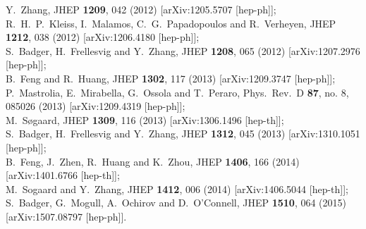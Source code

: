 \documentclass[aps,prd,preprint,groupedaddress,nofootinbib,showpacs,eqsecnum]{revtex4}
\begin{document}
\begin{thebibliography}{99}
Y.~Zhang,
JHEP {\bf 1209}, 042 (2012)
[arXiv:1205.5707 [hep-ph]];\\
R.~H.~P.~Kleiss, I.~Malamos, C.~G.~Papadopoulos and R.~Verheyen,
JHEP {\bf 1212}, 038 (2012)
[arXiv:1206.4180 [hep-ph]];\\
S.~Badger, H.~Frellesvig and Y.~Zhang,
JHEP {\bf 1208}, 065 (2012)
[arXiv:1207.2976 [hep-ph]];\\
B.~Feng and R.~Huang,
JHEP {\bf 1302}, 117 (2013)
[arXiv:1209.3747 [hep-ph]];\\
P.~Mastrolia, E.~Mirabella, G.~Ossola and T.~Peraro,
Phys.\ Rev.\ D {\bf 87}, no. 8, 085026 (2013)
[arXiv:1209.4319 [hep-ph]];\\
M.~Søgaard,
JHEP {\bf 1309}, 116 (2013)
[arXiv:1306.1496 [hep-th]];\\
S.~Badger, H.~Frellesvig and Y.~Zhang,
JHEP {\bf 1312}, 045 (2013)
[arXiv:1310.1051 [hep-ph]];\\
B.~Feng, J.~Zhen, R.~Huang and K.~Zhou,
JHEP {\bf 1406}, 166 (2014)
[arXiv:1401.6766 [hep-th]];\\
M.~Sogaard and Y.~Zhang,
JHEP {\bf 1412}, 006 (2014)
[arXiv:1406.5044 [hep-th]];\\
S.~Badger, G.~Mogull, A.~Ochirov and D.~O'Connell,
JHEP {\bf 1510}, 064 (2015)
[arXiv:1507.08797 [hep-ph]].


\end{thebibliography}
\end{document}
